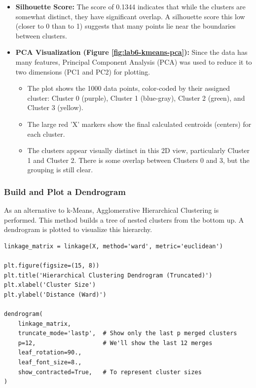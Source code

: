 \documentclass[12pt,a4paper]{article}
\begin{document}
\begin{itemize}
    \item \textbf{Silhouette Score:} The score of 0.1344 indicates that while the clusters are somewhat distinct, they have significant overlap. A silhouette score this low (closer to 0 than to 1) suggests that many points lie near the boundaries between clusters.
    \item \textbf{PCA Visualization (Figure \ref{fig:lab6-kmeans-pca}):} Since the data has many features, Principal Component Analysis (PCA) was used to reduce it to two dimensions (PC1 and PC2) for plotting.
        \begin{itemize}
            \item The plot shows the 1000 data points, color-coded by their assigned cluster: Cluster 0 (purple), Cluster 1 (blue-gray), Cluster 2 (green), and Cluster 3 (yellow).
            \item The large red 'X' markers show the final calculated centroids (centers) for each cluster.
            \item The clusters appear visually distinct in this 2D view, particularly Cluster 1 and Cluster 2. There is some overlap between Clusters 0 and 3, but the grouping is still clear.
        \end{itemize}
\end{itemize}

\subsubsection{Build and Plot a Dendrogram}
As an alternative to k-Means, Agglomerative Hierarchical Clustering is performed. This method builds a tree of nested clusters from the bottom up. A dendrogram is plotted to visualize this hierarchy.
\begin{lstlisting}[caption={Generating a truncated dendrogram using hierarchical clustering.}, label={lst:lab6-dendro}]
linkage_matrix = linkage(X, method='ward', metric='euclidean')

plt.figure(figsize=(15, 8))
plt.title('Hierarchical Clustering Dendrogram (Truncated)')
plt.xlabel('Cluster Size')
plt.ylabel('Distance (Ward)')

dendrogram(
    linkage_matrix,
    truncate_mode='lastp',  # Show only the last p merged clusters
    p=12,                   # We'll show the last 12 merges
    leaf_rotation=90.,
    leaf_font_size=8.,
    show_contracted=True,   # To represent cluster sizes
)
\end{lstlisting}
\end{document}
